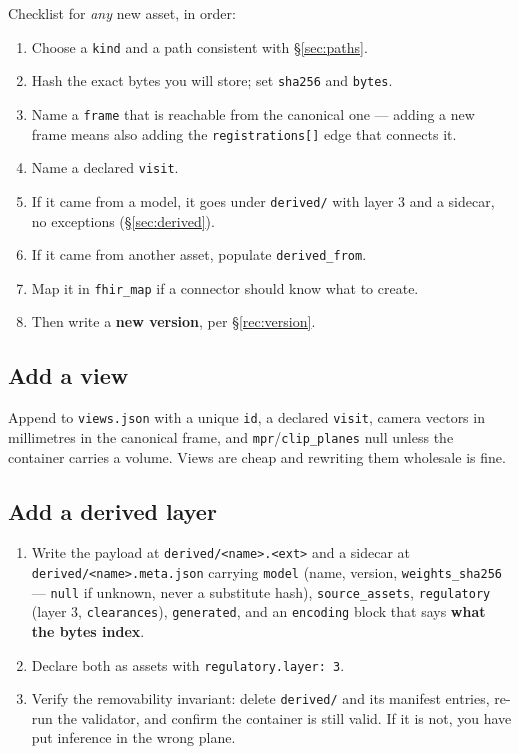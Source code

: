 \documentclass[11pt,a4paper]{article}
\newcommand{\code}[1]{\texttt{\small #1}}
\begin{document}
Checklist for \emph{any} new asset, in order:
\begin{enumerate}
  \item Choose a \code{kind} and a path consistent with \S\ref{sec:paths}.
  \item Hash the exact bytes you will store; set \code{sha256} and \code{bytes}.
  \item Name a \code{frame} that is reachable from the canonical one --- adding a new frame
  means also adding the \code{registrations[]} edge that connects it.
  \item Name a declared \code{visit}.
  \item If it came from a model, it goes under \code{derived/} with layer 3 and a sidecar,
  no exceptions (\S\ref{sec:derived}).
  \item If it came from another asset, populate \code{derived\_from}.
  \item Map it in \code{fhir\_map} if a connector should know what to create.
  \item Then write a \textbf{new version}, per \S\ref{rec:version}.
\end{enumerate}

\subsection{Add a view}

Append to \code{views.json} with a unique \code{id}, a declared \code{visit}, camera
vectors in millimetres in the canonical frame, and \code{mpr}/\code{clip\_planes} null
unless the container carries a volume. Views are cheap and rewriting them wholesale is
fine.

\subsection{Add a derived layer}

\begin{enumerate}
  \item Write the payload at \code{derived/<name>.<ext>} and a sidecar at
  \code{derived/<name>.meta.json} carrying \code{model} (name, version,
  \code{weights\_sha256} --- \code{null} if unknown, never a substitute hash),
  \code{source\_assets}, \code{regulatory} (layer 3, \code{clearances}),
  \code{generated}, and an \code{encoding} block that says \textbf{what the bytes index}.
  \item Declare both as assets with \code{regulatory.layer: 3}.
  \item Verify the removability invariant: delete \code{derived/} and its manifest entries,
  re-run the validator, and confirm the container is still valid. If it is not, you have
  put inference in the wrong plane.
\end{enumerate}
\end{document}
